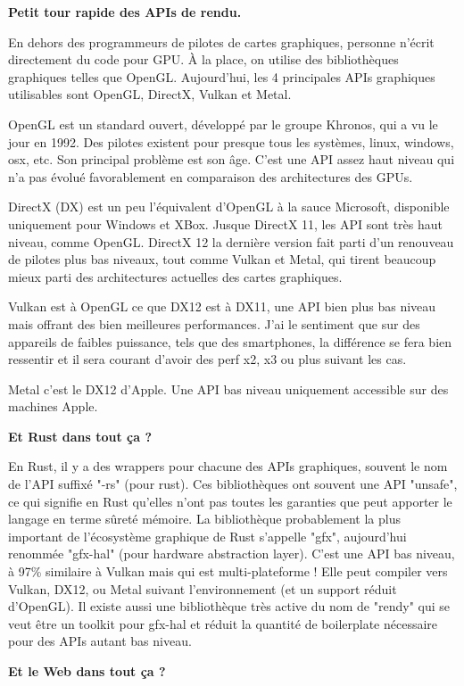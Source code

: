 \textbf{Petit tour rapide des APIs de rendu.}

En dehors des programmeurs de pilotes de cartes graphiques, personne n'écrit directement du code pour GPU. À la place, on utilise des bibliothèques graphiques telles que OpenGL. Aujourd'hui, les 4 principales APIs graphiques utilisables sont OpenGL, DirectX, Vulkan et Metal.

OpenGL est un standard ouvert, développé par le groupe Khronos, qui a vu le jour en 1992. Des pilotes existent pour presque tous les systèmes, linux, windows, osx, etc. Son principal problème est son âge. C'est une API assez haut niveau qui n'a pas évolué favorablement en comparaison des architectures des GPUs.

DirectX (DX) est un peu l'équivalent d'OpenGL à la sauce Microsoft, disponible uniquement pour Windows et XBox. Jusque DirectX 11, les API sont très haut niveau, comme OpenGL. DirectX 12 la dernière version fait parti d'un renouveau de pilotes plus bas niveaux, tout comme Vulkan et Metal, qui tirent beaucoup mieux parti des architectures actuelles des cartes graphiques.

Vulkan est à OpenGL ce que DX12 est à DX11, une API bien plus bas niveau mais offrant des bien meilleures performances. J'ai le sentiment que sur des appareils de faibles puissance, tels que des smartphones, la différence se fera bien ressentir et il sera courant d'avoir des perf x2, x3 ou plus suivant les cas.

Metal c'est le DX12 d'Apple. Une API bas niveau uniquement accessible sur des machines Apple.

\textbf{Et Rust dans tout ça ?}

En Rust, il y a des wrappers pour chacune des APIs graphiques, souvent le nom de l'API suffixé "-rs" (pour rust). Ces bibliothèques ont souvent une API "unsafe", ce qui signifie en Rust qu'elles n'ont pas toutes les garanties que peut apporter le langage en terme sûreté mémoire. La bibliothèque probablement la plus important de l'écosystème graphique de Rust s'appelle "gfx", aujourd'hui renommée "gfx-hal" (pour hardware abstraction layer). C'est une API bas niveau, à 97\% similaire à Vulkan mais qui est multi-plateforme ! Elle peut compiler vers Vulkan, DX12, ou Metal suivant l'environnement (et un support réduit d'OpenGL). Il existe aussi une bibliothèque très active du nom de "rendy" qui se veut être un toolkit pour gfx-hal et réduit la quantité de boilerplate nécessaire pour des APIs autant bas niveau.

\textbf{Et le Web dans tout ça ?}

